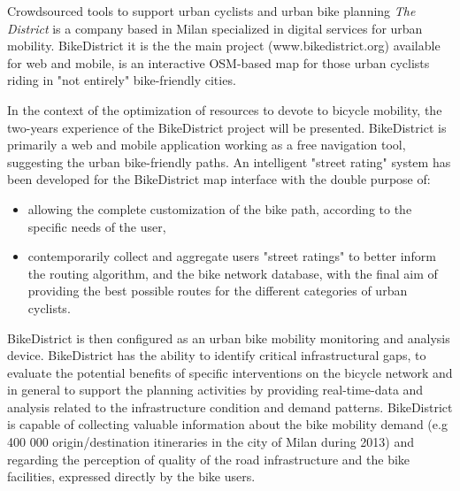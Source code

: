 %
{Crowdsourced tools to support urban cyclists and urban bike planning}%
{\emph{The District} is a company based in Milan specialized in digital services for urban mobility. BikeDistrict it is the the main project (www.bikedistrict.org) available for web and mobile, is an interactive OSM-based map for those urban cyclists riding in "not entirely" bike-friendly cities.}%
{In the context of the optimization of resources to devote to bicycle mobility, the two-years experience of the BikeDistrict project will be presented.
BikeDistrict is primarily a web and mobile application working as a free navigation tool, suggesting the urban bike-friendly paths. 
An intelligent "street rating" system has been developed for the BikeDistrict map interface with the double purpose of:
\begin{itemize}
\item allowing the complete customization of the bike path, according to the specific needs of the user,
\item contemporarily collect and aggregate users "street ratings" to better inform the routing algorithm, and the bike network database, with the final aim of providing the best possible routes for the different categories of urban cyclists. 
\end{itemize}
 
BikeDistrict is then configured as an urban bike mobility monitoring and analysis device. BikeDistrict has the ability to identify critical infrastructural gaps, to evaluate the potential benefits of specific interventions on the bicycle network and in general to support the planning activities by providing real-time-data and analysis related to the infrastructure condition and demand patterns. BikeDistrict is capable of collecting valuable information about the bike mobility demand (e.g 400 000 origin/destination itineraries in the city of Milan during 2013) and regarding the perception of quality of the road infrastructure and the bike facilities, expressed directly by the bike users. }

